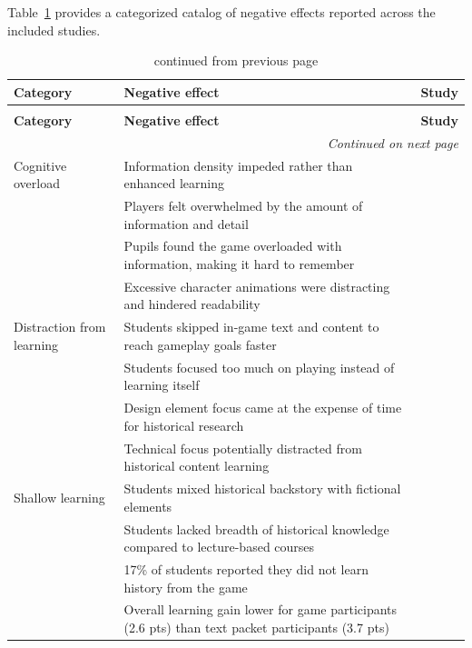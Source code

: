 \documentclass[a4paper,fleqn]{cas-sc}
\begin{document}
Table~\ref{tab:negative_effects} provides a categorized catalog of negative effects reported across the included studies.

\begin{longtable}{|p{}|p{}|l|}
\caption{Catalog of reported negative effects of gamification in history education.}\label{tab:negative_effects}\\
\hline
\hfil \textbf{Category} & \hfil \textbf{Negative effect} & \hfill \textbf{Study} \\
\hline
\endfirsthead
\caption[]{ continued from previous page}\\
\hline
\hfil \textbf{Category} & \hfil \textbf{Negative effect} & \hfill \textbf{Study} \\
\hline
\endhead
\hline
\multicolumn{3}{r}{\textit{Continued on next page}} \\
\endfoot
\hline
\endlastfoot
Cognitive overload & Information density impeded rather than enhanced learning & \citet{52Lin2011265} \\
 & Players felt overwhelmed by the amount of information and detail & \citet{54Gibson2007} \\
 & Pupils found the game overloaded with information, making it hard to remember & \citet{41Petersen2023301} \\
 & Excessive character animations were distracting and hindered readability & \citet{21Ghulamani2017} \\
\hline
Distraction from learning & Students skipped in-game text and content to reach gameplay goals faster & \citet{60Hoy2018} \\
 & Students focused too much on playing instead of learning itself & \citet{67Lin201296} \\
 & Design element focus came at the expense of time for historical research & \citet{14Forsyth2023} \\
 & Technical focus potentially distracted from historical content learning & \citet{14Forsyth2023} \\
\hline
Shallow learning & Students mixed historical backstory with fictional elements & \citet{56Akkerman2009449} \\
 & Students lacked breadth of historical knowledge compared to lecture-based courses & \citet{29Stiso20201165} \\
 & 17\% of students reported they did not learn history from the game & \citet{47Clara2010156} \\
 & Overall learning gain lower for game participants (2.6 pts) than text packet participants (3.7 pts) & \citet{74Fendt2019} \\

\end{longtable}
\end{document}
